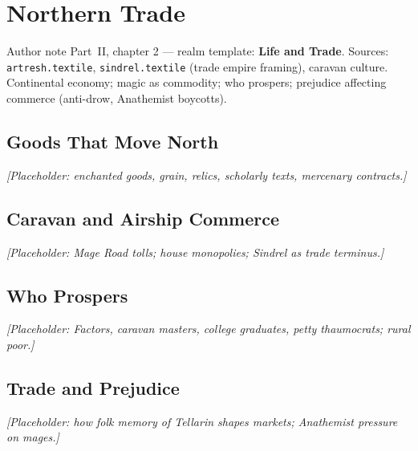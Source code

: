 \chapter{Northern Trade}

\begin{DndComment}{Author note}
  Part~II, chapter 2 --- realm template: \textbf{Life and Trade}.
  Sources: \texttt{artresh.textile}, \texttt{sindrel.textile} (trade empire framing), caravan culture.
  Continental economy; magic as commodity; who prospers; prejudice affecting commerce (anti-drow, Anathemist boycotts).
\end{DndComment}

\section{Goods That Move North}

\textit{[Placeholder: enchanted goods, grain, relics, scholarly texts, mercenary contracts.]}

\section{Caravan and Airship Commerce}

\textit{[Placeholder: Mage Road tolls; house monopolies; Sindrel as trade terminus.]}

\section{Who Prospers}

\textit{[Placeholder: Factors, caravan masters, college graduates, petty thaumocrats; rural poor.]}

\section{Trade and Prejudice}

\textit{[Placeholder: how folk memory of Tellarin shapes markets; Anathemist pressure on mages.]}
